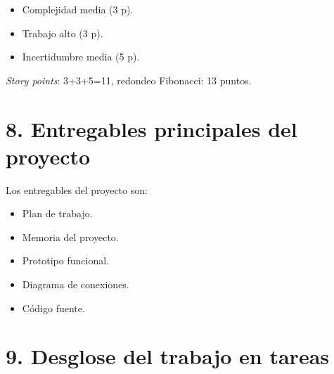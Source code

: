 \documentclass[
11pt, %
]{charter}
\begin{document}
	\begin{itemize}
		\item Complejidad media (3 p).
		\item Trabajo alto (3 p). 
		\item Incertidumbre media (5 p). 
	\end{itemize}
	\textit{Story points}: 3+3+5=11, redondeo Fibonacci: 13 puntos.


\section{8. Entregables principales del proyecto}
\label{sec:entregables}

Los entregables del proyecto son:

\begin{itemize}
	\item Plan de trabajo.
	\item Memoria del proyecto. 
	\item Prototipo funcional. 
	\item Diagrama de conexiones.
	\item Código fuente.
\end{itemize}

\section{9. Desglose del trabajo en tareas}
\label{sec:wbs}
\end{document}
